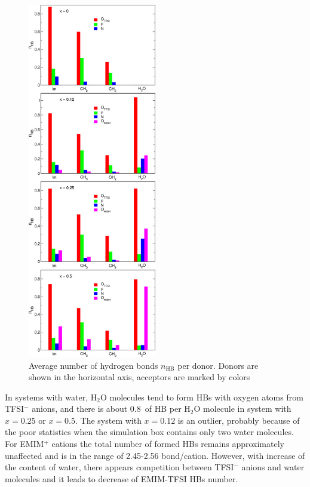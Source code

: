 \begin{figure}
    \centering
    \includegraphics[width=0.5\textwidth]{img/3-structural-data-from-md-simulations/6-il-h2o/hb-statistics.png}
    \caption{Average number of hydrogen bonds $n_{\text{HB}}$ per donor. Donors are shown in the horizontal axis, acceptors are marked by colors}
    \label{fig:il-h2o-hb-statistics}
\end{figure}

In systems with water, H$_2$O molecules tend to form HBs with oxygen atoms from TFSI$^{-}$ anions, and there is about 0.8~of HB per H$_2$O molecule in system with $x = 0.25$ or $x = 0.5$. The system with $x = 0.12$ is an outlier, probably because of the poor statistics when the simulation box contains only two water molecules. For EMIM$^{+}$ cations the total number of formed HBs remains approximately unaffected and is in the range of 2.45-2.56 bond/cation. However, with increase of the content of water, there appears competition between TFSI$^{-}$ anions and water molecules and it leads to decrease of EMIM-TFSI HBs number.

